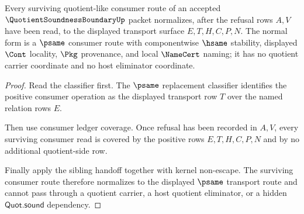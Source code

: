 \begin{theorem}
\label{thm:quotient-soundness-boundary-psame-consumer-normalization}
Every surviving quotient-like consumer route of an accepted
$\QuotientSoundnessBoundaryUp$ packet normalizes, after the refusal rows
$A,V$ have been read, to the displayed transport surface $E,T,H,C,P,N$. The
normal form is a $\psame$ consumer route with componentwise $\hsame$ stability,
displayed $\Cont$ locality, $\Pkg$ provenance, and local $\NameCert$ naming; it
has no quotient carrier coordinate and no host eliminator coordinate.
\end{theorem}
\begin{proof}
Read the classifier first. The $\psame$ replacement classifier identifies the
positive consumer operation as the displayed transport row $T$ over the named
relation rows $E$.

Then use consumer ledger coverage. Once refusal has been recorded in $A,V$,
every surviving consumer read is covered by the positive rows $E,T,H,C,P,N$
and by no additional quotient-side row.

Finally apply the sibling handoff together with kernel non-escape. The
surviving consumer route therefore normalizes to the displayed $\psame$
transport route and cannot pass through a quotient carrier, a host quotient
eliminator, or a hidden $\mathsf{Quot.sound}$ dependency.
\end{proof}

